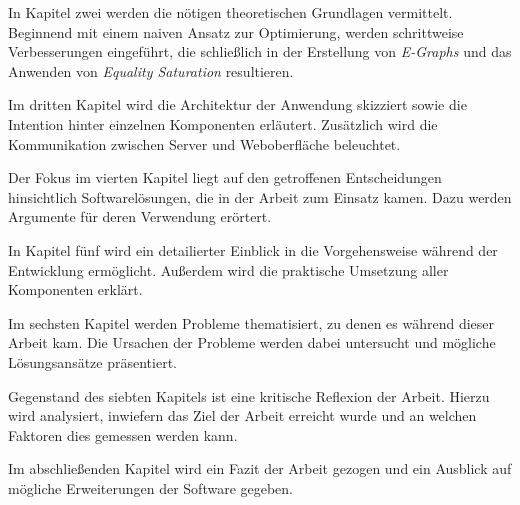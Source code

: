 \vspace{-2mm}

In Kapitel zwei werden die nötigen theoretischen Grundlagen vermittelt. Beginnend mit einem naiven Ansatz zur Optimierung, werden schrittweise Verbesserungen
eingeführt, die schließlich in der Erstellung von \textit{E-Graphs} und das Anwenden von \textit{Equality Saturation} resultieren. 

\vspace{6mm}

\vspace{-2mm}

Im dritten Kapitel wird die Architektur der Anwendung skizziert sowie die Intention hinter einzelnen Komponenten erläutert. Zusätzlich wird die Kommunikation zwischen 
Server und Weboberfläche beleuchtet. 

\vspace{6mm}

\vspace{-2mm}

Der Fokus im vierten Kapitel liegt auf den getroffenen Entscheidungen hinsichtlich Softwarelösungen, die in der Arbeit zum Einsatz kamen. Dazu werden Argumente für deren Verwendung erörtert.

\vspace{6mm}

\vspace{-2mm}

In Kapitel fünf wird ein detailierter Einblick in die Vorgehensweise während der Entwicklung ermöglicht. Außerdem wird die praktische Umsetzung aller Komponenten erklärt.

\vspace{6mm}

\vspace{-2mm}

Im sechsten Kapitel werden Probleme thematisiert, zu denen es während dieser Arbeit kam. Die Ursachen der Probleme werden dabei untersucht und mögliche Lösungsansätze präsentiert. 

\vspace{6mm}

\vspace{-2mm}

Gegenstand des siebten Kapitels ist eine kritische Reflexion der Arbeit. Hierzu wird analysiert, inwiefern das Ziel der Arbeit erreicht wurde und an welchen Faktoren dies gemessen werden kann.

\vspace{6mm}

\vspace{-2mm}

Im abschließenden Kapitel wird ein Fazit der Arbeit gezogen und ein Ausblick auf mögliche Erweiterungen der Software gegeben.
